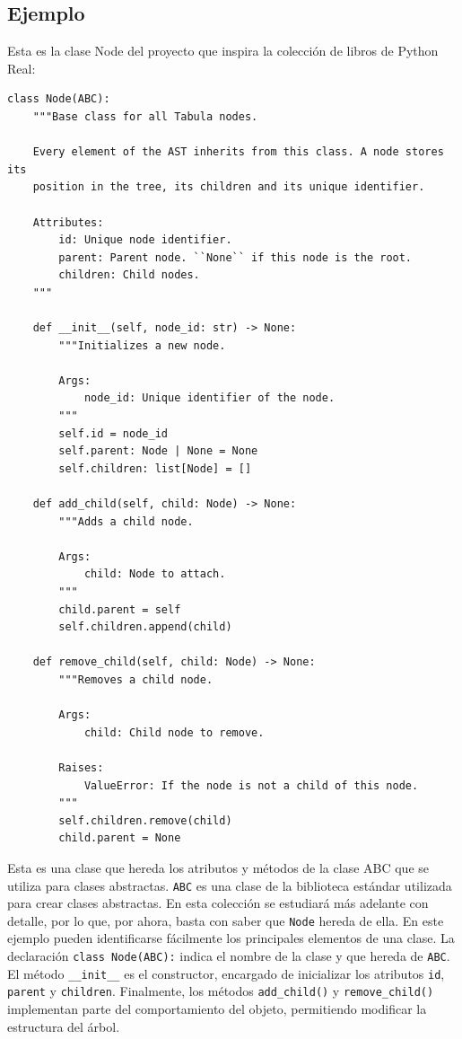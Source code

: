 \documentclass[11pt,a5paper,twoside]{book}
\begin{document}
\subsection{Ejemplo}
Esta es la clase Node del proyecto que inspira la colección de libros de Python Real: 

\newpage


\begin{tcolorbox}
\scriptsize
 \begin{verbatim}
class Node(ABC):
    """Base class for all Tabula nodes.

    Every element of the AST inherits from this class. A node stores its
    position in the tree, its children and its unique identifier.

    Attributes:
        id: Unique node identifier.
        parent: Parent node. ``None`` if this node is the root.
        children: Child nodes.
    """

    def __init__(self, node_id: str) -> None:
        """Initializes a new node.

        Args:
            node_id: Unique identifier of the node.
        """
        self.id = node_id
        self.parent: Node | None = None
        self.children: list[Node] = []

    def add_child(self, child: Node) -> None:
        """Adds a child node.

        Args:
            child: Node to attach.
        """
        child.parent = self
        self.children.append(child)

    def remove_child(self, child: Node) -> None:
        """Removes a child node.

        Args:
            child: Child node to remove.

        Raises:
            ValueError: If the node is not a child of this node.
        """
        self.children.remove(child)
        child.parent = None
\end{verbatim}
\end{tcolorbox}
Esta es una clase que hereda los atributos y métodos de la clase ABC que se utiliza para clases abstractas. {\scriptsize \texttt{ABC}} es una clase de la biblioteca estándar utilizada para crear clases abstractas. En esta colección se estudiará más adelante con detalle, por lo que, por ahora, basta con saber que {\scriptsize \texttt{Node}} hereda de ella.
En este ejemplo pueden identificarse fácilmente los principales elementos de una clase. La declaración {\scriptsize \texttt{class Node(ABC):}} indica el nombre de la clase y que hereda de {\scriptsize \texttt{ABC}}. El método {\scriptsize \texttt{\_\_init\_\_}} es el constructor, encargado de inicializar los atributos {\scriptsize \texttt{id}}, {\scriptsize \texttt{parent}} y {\scriptsize \texttt{children}}. Finalmente, los métodos {\scriptsize \texttt{add\_child()}} y {\scriptsize \texttt{remove\_child()}} implementan parte del comportamiento del objeto, permitiendo modificar la estructura del árbol.
\end{document}
